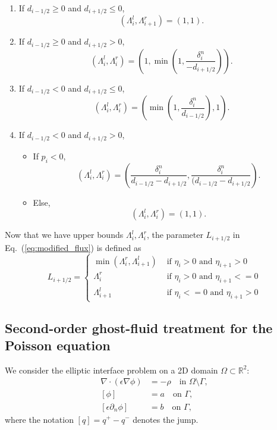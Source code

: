 \begin{enumerate}
	\item If $d_{i-1/2} \geq 0$ and $d_{i+1/2} \leq 0$,
	      $$(\Lambda_i^l, \Lambda_{i+1}^r) = (1,1).$$
	\item If $d_{i-1/2} \geq 0$ and $d_{i+1/2} > 0$,
	      $$(\Lambda_i^l,\Lambda_i^r) = \left(1, \min\left(1, \frac{\delta_i^n}{-d_{i+1/2}}\right) \right).$$
	\item If $d_{i-1/2} < 0$ and $d_{i+1/2} \leq 0$,
	      $$(\Lambda_i^l, \Lambda_i^r) = \left(\min\left(1, \frac{\delta_i^n}{d_{i-1/2}}\right), 1 \right).$$
	\item If $d_{i-1/2} < 0$ and $d_{i+1/2} > 0$,
	      \begin{itemize}
		      \item If $p_i < 0$,
		            $$(\Lambda_i^l, \Lambda_i^r) = \left(\frac{\delta_i^n}{d_{i-1/2} - d_{i+1/2}}, \frac{\delta_i^n}{(d_{i-1/2} - d_{i+1/2}}\right).$$
		      \item Else,
		            $$(\Lambda_i^l, \Lambda_i^r) = (1,1).$$
	      \end{itemize}
\end{enumerate}

Now that we have upper bounds $\Lambda_i^l, \Lambda_i^r$, the parameter $L_{i+1/2}$ in Eq.~(\ref{eq:modified_flux}) is defined as
\begin{equation}
	L_{i+1/2} = \begin{cases}
		\min(\Lambda_i^r, \Lambda_{i+1}^l) & \text{ if $\eta_i>0$ and $\eta_{i+1} > 0$}  \\
		\Lambda_i^r                        & \text{ if $\eta_i>0$ and $\eta_{i+1} <= 0$} \\
		\Lambda_{i+1}^l                    & \text{ if $\eta_i<=0$ and $\eta_{i+1} > 0$}
	\end{cases}
\end{equation}

\subsection{Second-order ghost-fluid treatment for the Poisson equation}

We consider the elliptic interface problem on a 2D domain $\Omega \subset \mathbb{R}^2$:
\begin{align}
	\nabla \cdot (\epsilon \nabla \phi) & = -\rho \quad \text{in } \Omega \setminus \Gamma, \\
	[\phi]                              & = a \quad \text{on } \Gamma,                      \\
	[\epsilon \partial_n \phi]          & = b \quad \text{on } \Gamma,
\end{align}
where the notation $[q] = q^+ - q^-$ denotes the jump.

